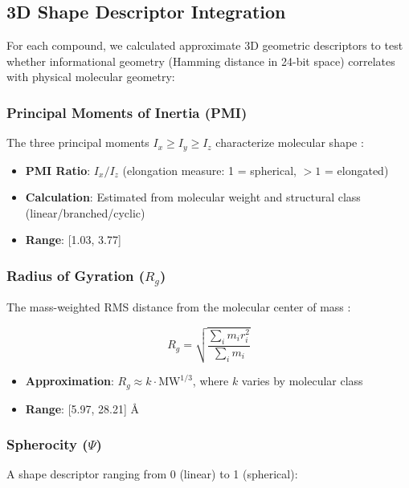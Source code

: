 \documentclass[11pt,letterpaper]{article}
\begin{document}
\subsection{3D Shape Descriptor Integration}

For each compound, we calculated approximate 3D geometric descriptors to test whether informational geometry (Hamming distance in 24-bit space) correlates with physical molecular geometry:

\subsubsection{Principal Moments of Inertia (PMI)}

The three principal moments $I_x \geq I_y \geq I_z$ characterize molecular shape \cite{Todeschini2009}:

\begin{itemize}
    \item \textbf{PMI Ratio}: $I_x / I_z$ (elongation measure: 1 = spherical, $>1$ = elongated)
    \item \textbf{Calculation}: Estimated from molecular weight and structural class (linear/branched/cyclic)
    \item \textbf{Range}: [1.03, 3.77]
\end{itemize}

\subsubsection{Radius of Gyration ($R_g$)}

The mass-weighted RMS distance from the molecular center of mass \cite{Todeschini2009}:

\begin{equation}
R_g = \sqrt{\frac{\sum_i m_i r_i^2}{\sum_i m_i}}
\end{equation}

\begin{itemize}
    \item \textbf{Approximation}: $R_g \approx k \cdot \text{MW}^{1/3}$, where $k$ varies by molecular class
    \item \textbf{Range}: [5.97, 28.21] Å
\end{itemize}

\subsubsection{Spherocity ($\Psi$)}

A shape descriptor ranging from 0 (linear) to 1 (spherical):
\end{document}
